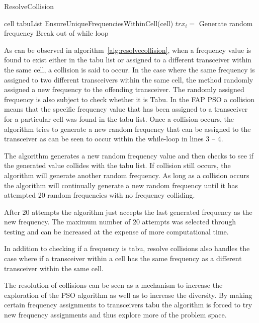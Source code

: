 \begin{algorithm}[H]
\caption{ResolveCollision}
\label{alg:resolvecollision}
\begin{algorithmic}[1]
	\Require cell
	\Require tabuList
    \State EnsureUniqueFrequenciesWithinCell(cell)
				\State $trx_i = $ Generate random frequency
					\State Break out of while loop
				\EndIf
			\EndWhile
	\EndFor
\end{algorithmic}
\end{algorithm}

As can be observed in algorithm~\ref{alg:resolvecollision}, when a frequency value is found to exist either in the tabu list or assigned to a different transceiver within the same cell,  a collision is said to occur. In the case where the same frequency is assigned to two different transceivers within the same cell, the method randomly assigned a new frequency to the offending transceiver. The randomly assigned frequency is also subject to check whether it is Tabu.  In the \gls{FAP} \gls{PSO} a collision means that the specific frequency value that has been assigned to a transceiver for a particular cell was found in the tabu list. Once a collision occurs, the algorithm tries to generate a new random frequency that can be assigned to the transceiver as can be seen to occur within the while-loop in lines 3 -- 4.

The algorithm generates a new random frequency value and then checks to see if the generated value collides with the tabu list. If collision still occurs, the algorithm will generate another random frequency. As long as a collision occurs the algorithm will continually generate a new random frequency until it has attempted 20 random frequencies with no frequency colliding. 

After 20 attempts the algorithm just accepts the last generated frequency as the new frequency. The maximum number of 20  attempts was selected through testing and can be increased at the expense of more computational time. 

In addition to checking if a frequency is tabu, resolve collisions also handles the case where if a transceiver within a cell has the same frequency as a different transceiver within the same cell.

The resolution of collisions can be seen as a mechanism to increase the exploration of the \gls{PSO} algorithm as well as to increase the diversity. By making certain frequency assignments to transceivers tabu the algorithm is forced to try new frequency assignments and thus explore more of the problem space.

